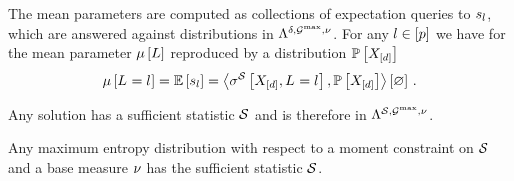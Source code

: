 The mean parameters are computed as collections of expectation queries to $s_{l}$, which are answered against distributions in $\Lambda^{\delta,\mathcal{G}^{\mathrm{max}},\nu}$.
For any $l\in[p]$ we have for the mean parameter $\mu\left[L\right]$ reproduced by a distribution $\mathbb{P}\left[X_{[d]}\right]$
\begin{align*}
    \mu\left[L_{}=l_{}\right]
    = \mathbb{E}\left[s_{l}\right]
    = \left\langle \sigma^{\mathcal{S}}\left[X_{[d]},L_{}=l_{}\right],\mathbb{P}\left[X_{[d]}\right]\right\rangle \left[ \varnothing \right] \, .
\end{align*}

Any solution has a sufficient statistic $\mathcal{S}$ and is therefore in $\Lambda^{\mathcal{S},\mathcal{G}^{\mathrm{max}},\nu}$.

\begin{theorem}
    \label{the:maxEntWithSufficientStatistic}
    Any maximum entropy distribution with respect to a moment constraint on $\mathcal{S}$ and a base measure $\nu$ has the sufficient statistic $\mathcal{S}$.
\end{theorem}
